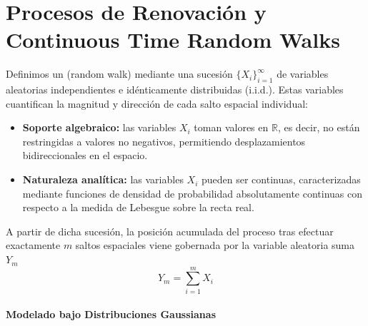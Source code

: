 \chapter[Procesos de Renovación y CTRW]{Procesos de Renovación y Continuous Time Random Walks}


\begin{definicion}
    Definimos un  (random walk) mediante una sucesión $\{X_i\}_{i=1}^{\infty}$ de variables aleatorias independientes e idénticamente distribuidas (i.i.d.). Estas variables cuantifican la magnitud y dirección de cada salto espacial individual:
    \begin{itemize}
        \item \textbf{Soporte algebraico:} las variables $X_i$ toman valores en $\mathbb{R}$, es decir, no están restringidas a valores no negativos, permitiendo desplazamientos bidireccionales en el espacio.
        \item \textbf{Naturaleza analítica:} las variables $X_i$ pueden ser continuas, caracterizadas mediante funciones de densidad de probabilidad absolutamente continuas con respecto a la medida de Lebesgue sobre la recta real.
    \end{itemize}
\end{definicion}


\noindent 
A partir de dicha sucesión, la posición acumulada del proceso tras efectuar exactamente $m$ saltos espaciales viene gobernada por la variable aleatoria suma $Y_m$
\[
Y_m = \sum_{i=1}^{m} X_i
\]

\subsubsection{Modelado bajo Distribuciones Gaussianas}

